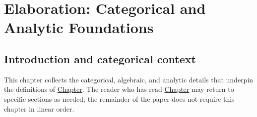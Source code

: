 \chapter{Elaboration: Categorical and Analytic Foundations}
\label{chap:elaboration}

\section{Introduction and categorical context}
\label{sec:elaboration-intro}

This chapter collects the categorical, algebraic, and analytic details
that underpin the definitions of \hyperref[chap:qou]{Chapter}. The reader
who has read \hyperref[chap:qou]{Chapter} may return to specific sections as
needed; the remainder of the paper does not require this chapter in
linear order.

